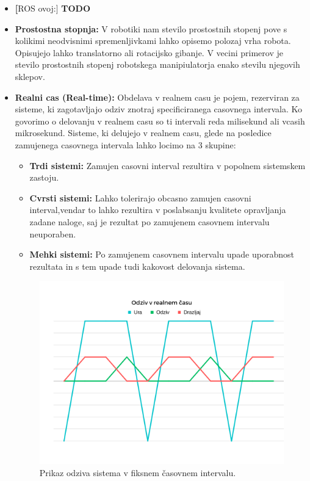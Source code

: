 \documentclass[a4paper,twoside,openright,12pt,slovene]{book}
\begin{document}
\begin{itemize}
    \item \textbf[ROS ovoj:] \label{ROS_wrapper} \textbf{TODO}



    \item \textbf{Prostostna stopnja:} \label{DOF}V robotiki nam stevilo prostostnih stopenj pove s kolikimi neodvisnimi spremenljivkami lahko opisemo polozaj vrha robota. Opisujejo lahko translatorno ali rotacijsko gibanje. V vecini primerov je stevilo prostostnih stopenj robotskega manipiulatorja enako stevilu njegovih sklepov. \cite{DOF_website}

    \item \textbf{Realni cas (Real-time):}\label{RealTime} Obdelava v realnem casu je pojem, rezerviran za sisteme, ki zagotavljajo odziv znotraj specificiranega casovnega intervala. Ko govorimo o delovanju v realnem casu so ti intervali reda milisekund ali vcasih mikrosekund. Sisteme, ki delujejo v realnem casu, glede na posledice zamujenega casovnega intervala lahko locimo na 3 skupine:
    \begin{itemize}
        \item \textbf{Trdi sistemi:} Zamujen casovni interval rezultira v popolnem sistemskem zastoju.
        \item \textbf{Cvrsti sistemi:} Lahko tolerirajo obcasno zamujen casovni interval,vendar to lahko rezultira v poslabsanju kvalitete opravljanja zadane naloge, saj je rezultat po zamujenem casovnem intervalu neuporaben.
        \item \textbf{Mehki sistemi:} Po zamujenem casovnem intervalu upade uporabnost rezultata in s tem upade tudi kakovost delovanja sistema.
    \end{itemize}

\begin{figure}[h]
    \centering
    \includegraphics[width=0.75\columnwidth]{Slike/Untitled design (1).png}
    \caption{\label{RealTime} Prikaz odziva sistema v fiksnem časovnem intervalu.}
\end{figure}



    
\end{itemize}


\cleardoublepage{} %



\end{document}
